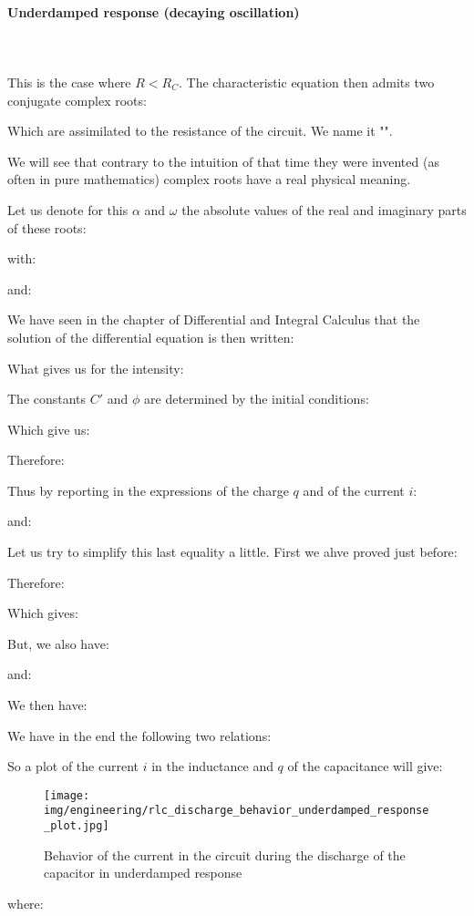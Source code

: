 	\paragraph{Underdamped response (decaying oscillation) }\mbox{}\\\\
	This is the case where $R<R_C$. The characteristic equation then admits two conjugate complex roots:
	
	Which are assimilated to the resistance of the circuit. We name it "".

	We will see that contrary to the intuition of that time they were invented (as often in pure mathematics) complex roots have a real physical meaning.

	Let us denote for this $\alpha$ and $\omega$ the absolute values of the real and imaginary parts of these roots:
	
	with:
	
	and:
	
	We have seen in the chapter of Differential and Integral Calculus  that the solution of the differential equation is then written:
	
	What gives us for the intensity:
	
	The constants $C'$ and $\phi$ are determined by the initial conditions:
	
	Which give us:
	
	Therefore:
	
	Thus by reporting in the expressions of the charge $q$ and of the current $i$:
	
	and:
	
	Let us try to simplify this last equality a little. First we ahve proved just before:
	
	Therefore:
	
	Which gives:
	
	But, we also have:
	
	and:
	
	We then have:
	
	We have in the end the following two relations:
	
	So a plot of the current $i$ in the inductance and $q$ of the capacitance will give:
	 \begin{figure}[H]
		\centering
		\texttt{[image: img/engineering/rlc\_discharge\_behavior\_underdamped\_response\_plot.jpg]}
		\caption[]{Behavior of the current in the circuit during the discharge of the capacitor in underdamped response}
	\end{figure}
	where:
	
